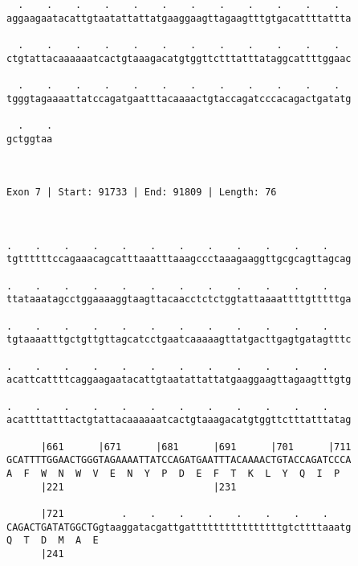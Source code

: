 \documentclass{article}
\begin{document}
\begin{Verbatim}
  .    .    .    .    .    .    .    .    .    .    .    .  
aggaagaatacattgtaatattattatgaaggaagttagaagtttgtgacattttattta
                                                            
  .    .    .    .    .    .    .    .    .    .    .    .  
ctgtattacaaaaaatcactgtaaagacatgtggttctttatttataggcattttggaac
                                                            
  .    .    .    .    .    .    .    .    .    .    .    .  
tgggtagaaaattatccagatgaatttacaaaactgtaccagatcccacagactgatatg
                                                            
  .    .
gctggtaa
        
        
 
Exon 7 | Start: 91733 | End: 91809 | Length: 76



.    .    .    .    .    .    .    .    .    .    .    .    
tgttttttccagaaacagcatttaaatttaaagccctaaagaaggttgcgcagttagcag
                                                            
.    .    .    .    .    .    .    .    .    .    .    .    
ttataaatagcctggaaaaggtaagttacaacctctctggtattaaaattttgtttttga
                                                            
.    .    .    .    .    .    .    .    .    .    .    .    
tgtaaaatttgctgttgttagcatcctgaatcaaaaagttatgacttgagtgatagtttc
                                                            
.    .    .    .    .    .    .    .    .    .    .    .    
acattcattttcaggaagaatacattgtaatattattatgaaggaagttagaagtttgtg
                                                            
.    .    .    .    .    .    .    .    .    .    .    .    
acattttatttactgtattacaaaaaatcactgtaaagacatgtggttctttatttatag
                                                            
      |661      |671      |681      |691      |701      |711
GCATTTTGGAACTGGGTAGAAAATTATCCAGATGAATTTACAAAACTGTACCAGATCCCA
A  F  W  N  W  V  E  N  Y  P  D  E  F  T  K  L  Y  Q  I  P  
      |221                          |231                    
  
      |721          .    .    .    .    .    .    .    .    
CAGACTGATATGGCTGgtaaggatacgattgattttttttttttttttgtcttttaaatg
Q  T  D  M  A  E                                            
      |241                                                  
  

\end{Verbatim}
\end{document}

